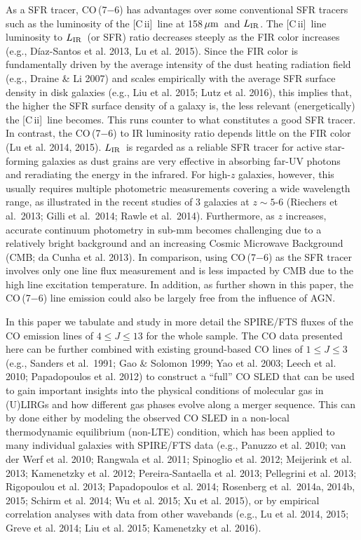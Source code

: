 \documentclass[preprint]{aastex}
\newcommand{\um}{\mbox{$\,\mu{\rm m}$}}
\newcommand{\LIR}{\mbox{$L_{\rm IR}$}}
\newcommand{\CII}{\mbox{[C\,{\sc ii}]}}
\begin{document}
As a SFR tracer, CO\,(7$-$6) has advantages over some conventional SFR tracers
such as the luminosity of the \CII\ line at 158\um\ and \LIR.  The \CII\ line 
luminosity to \LIR\ (or SFR) ratio decreases steeply as the FIR color increases 
(e.g., D\'iaz-Santos et al. 2013, Lu et al. 2015).  Since the FIR color is fundamentally
driven by the average intensity of the dust heating radiation field (e.g., Draine 
\& Li 2007) and scales empirically with the average SFR surface density in disk 
galaxies (e.g., Liu et al. 2015; Lutz et al. 2016), this implies that, the higher 
the SFR surface density of a galaxy is, the less relevant (energetically) the \CII\ 
line becomes.  This runs counter to what constitutes a good SFR tracer.  In contrast,
the CO\,(7$-$6) to IR luminosity ratio depends little on the FIR color 
(Lu et al. 2014, 2015).  \LIR\ is regarded as a reliable SFR tracer for active 
star-forming galaxies as dust grains are very effective in absorbing far-UV photons and 
reradiating the energy in the infrared.   For high-$z$ galaxies, however, this usually 
requires multiple photometric measurements covering a wide wavelength 
range, as illustrated in the recent studies of 3 galaxies at $z \sim 5$-6 
(Riechers et al.~2013; Gilli et al.~2014; Rawle et al.~2014).   Furthermore, as $z$ 
increases, accurate continuum photometry in sub-mm becomes challenging due to a 
relatively bright background and an increasing Cosmic Microwave Background (CMB; 
da Cunha et al. 2013).  In comparison, 
using CO\,(7$-$6) as the SFR tracer involves only one line flux measurement and 
is less impacted by CMB due to the high line excitation temperature. In addition, as 
further shown in this paper, the CO\,(7$-$6) line emission could also be largely
free from the influence of AGN.


In this paper we tabulate and study in more detail the SPIRE/FTS fluxes of 
the CO emission lines of $4 \leqslant J \leqslant 13$ for the whole sample.
The CO data presented here can be further combined with existing 
ground-based CO lines of $1 \leqslant J \leqslant 3$ (e.g., Sanders et al.~1991; 
Gao \& Solomon 1999; Yao et al. 2003; Leech et al. 2010; Papadopoulos et al. 2012) 
to construct a ``full''  CO SLED that can be used to gain important insights into 
the physical conditions 
of molecular gas in (U)LIRGs and how different gas phases evolve along
a merger sequence.  This can by done either by modeling the observed CO SLED in 
a non-local thermodynamic equilibrium (non-LTE) condition, which has been applied 
to many individual galaxies with SPIRE/FTS data (e.g., Panuzzo et al. 2010; 
van der Werf et al. 2010;  Rangwala et al. 2011; Spinoglio et al. 2012; 
Meijerink et al. 2013;  Kamenetzky et al. 2012; Pereira-Santaella et al. 2013; 
Pellegrini et al. 2013;  Rigopoulou et al. 2013; Papadopoulos et al. 2014; 
Rosenberg et al.~2014a, 2014b, 2015; Schirm et al. 2014;   Wu et al. 2015; 
Xu et al. 2015), or by empirical correlation analyses with data from other wavebands
(e.g., Lu et al. 2014, 2015; Greve et al. 2014; Liu et al. 2015; Kamenetzky et al. 2016).
\end{document}
